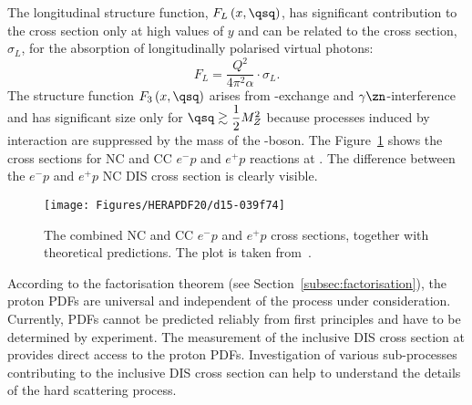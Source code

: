 The longitudinal structure function, $F_L\left(x,\qsq\right)$, has significant contribution to the cross section only at high values of $y$ and can be related to the cross section, $\sigma_L$, for the absorption of longitudinally polarised virtual photons:
\begin{equation}
F_L = \frac{Q^2}{4\pi^2\alpha}\cdot \sigma_L.
\label{eq:sigmal}
\end{equation}
The structure function $F_3\left(x,\qsq\right)$ arises from \zn-exchange and $\gamma\zn$-interference and has significant size only for $\qsq \gtrsim \dfrac{1}{2}M^2_Z$ because processes induced by \zn interaction are suppressed by the mass of the \zn-boson. The Figure~\ref{d15-039f74} shows the \dsdqsq cross sections for NC and CC $e^-p$ and $e^+p$ reactions at \hera. The difference between the $e^-p$ and $e^+p$ NC DIS cross section is clearly visible.
\begin{figure}[t!]
	\centering
		\texttt{[image: Figures/HERAPDF20/d15-039f74]}
	\caption{The combined \hera NC and CC $e^-p$ and $e^+p$ cross sections, \dsdqsq together with theoretical predictions. The plot is taken from~\protect\cite{Abramowicz:2015mha}.}
	\label{d15-039f74}
\end{figure}

According to the factorisation theorem (see Section~\ref{subsec:factorisation}), the proton PDFs are universal and independent of the process under consideration. Currently, PDFs cannot be predicted reliably from first principles and have to be determined by experiment. The measurement of the inclusive DIS cross section at \hera provides direct access to the proton PDFs. Investigation of various sub-processes contributing to the inclusive DIS cross section can help to understand the details of the hard scattering process.
